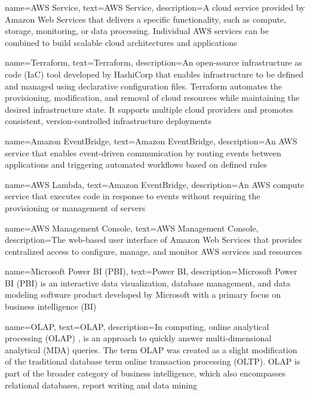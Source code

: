 {
    name={AWS Service},
    text={AWS Service},
    description={A cloud service provided by Amazon Web Services that delivers a specific functionality, such as compute, storage, monitoring, or data processing. Individual AWS services can be combined to build scalable cloud architectures and applications}
}


{
    name={Terraform},
        text={Terraform},
    description={An open-source infrastructure as code (IaC) tool developed by HashiCorp that enables infrastructure to be defined and managed using declarative configuration files. Terraform automates the provisioning, modification, and removal of cloud resources while maintaining the desired infrastructure state. It supports multiple cloud providers and promotes consistent, version-controlled infrastructure deployments}
}


{
    name={Amazon EventBridge},
     text={Amazon EventBridge},
    description={An AWS service that enables event-driven communication by routing events between applications and triggering automated workflows based on defined rules}
}

{
    name={AWS Lambda},
    text={Amazon EventBridge},
    description={An AWS compute service that executes code in response to events without requiring the provisioning or management of servers}
}

{
    name={AWS Management Console},
    text={AWS Management Console},
    description={The web-based user interface of Amazon Web Services that provides centralized access to configure, manage, and monitor AWS services and resources}
}

{
    name={Microsoft Power BI (PBI)},
    text={Power BI},
    description={Microsoft Power BI (PBI) is an interactive data visualization, database management, and data modeling software product developed by Microsoft with a primary focus on business intelligence (BI)}
}

{
    name={OLAP},
    text={OLAP},
    description={In computing, online analytical processing (OLAP) , is an approach to quickly answer multi-dimensional analytical (MDA) queries. The term OLAP was created as a slight modification of the traditional database term online transaction processing (OLTP). OLAP is part of the broader category of business intelligence, which also encompasses relational databases, report writing and data mining}
}

